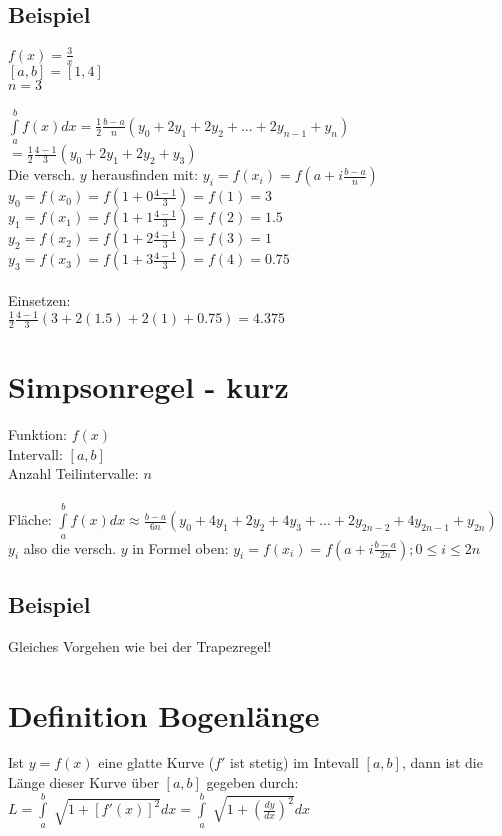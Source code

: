 \documentclass[../main.tex]{subfiles}
\begin{document}
\subsection{Beispiel}
$f(x)=\frac{3}{x}$ \\
$[a,b]=[1,4]$ \\
$n=3$ \\
\\
$\int\limits_a^bf(x)dx=\frac{1}{2}\frac{b-a}{n}(y_0+2y_1+2y_2+...+2y_{n-1}+y_n)$
$=\frac{1}{2}\frac{4-1}{3}(y_0+2y_1+2y_2+y_3)$ \\
Die versch. $y$ herausfinden mit: $y_i=f(x_i)=f(a+i\frac{b-a}{n})$ \\
$y_0=f(x_0)=f(1+0\frac{4-1}{3})=f(1)=3$ \\
$y_1=f(x_1)=f(1+1\frac{4-1}{3})=f(2)=1.5$ \\
$y_2=f(x_2)=f(1+2\frac{4-1}{3})=f(3)=1$ \\
$y_3=f(x_3)=f(1+3\frac{4-1}{3})=f(4)=0.75$ \\
\\
Einsetzen: \\
$\frac{1}{2}\frac{4-1}{3}(3+2(1.5)+2(1)+0.75) = 4.375$ 

\section{Simpsonregel - kurz}
Funktion: $f(x)$ \\
Intervall: $[a,b]$ \\
Anzahl Teilintervalle: $n$ \\
\\
Fläche: $\int\limits_a^bf(x)dx\approx\frac{b-a}{6n}(y_0+4y_1+2y_2+4y_3+...+2y_{2n-2}+4y_{2n-1}+y_{2n})$ \\
$y_i$ also die versch. $y$ in Formel oben: $y_i=f(x_i)=f(a+i\frac{b-a}{2n});0\leq i\leq 2n$

\subsection{Beispiel}
Gleiches Vorgehen wie bei der Trapezregel!

\section{Definition Bogenlänge}
Ist $y=f(x)$ eine glatte Kurve ($f'$ ist stetig) im Intevall $[a,b]$, dann 
ist die Länge dieser Kurve über $[a,b]$ gegeben durch: \\
$L=\int\limits_a^b\sqrt[]{1+[f'(x)]^2}dx=\int\limits_a^b\sqrt[]{1+(\frac{dy}{dx})^2}dx$
\end{document}
